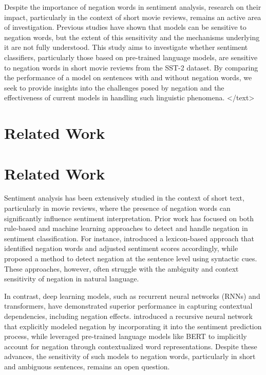 \documentclass{article}
\begin{document}
Despite the importance of negation words in sentiment analysis, research on their impact, particularly in the context of short movie reviews, remains an active area of investigation. Previous studies have shown that models can be sensitive to negation words, but the extent of this sensitivity and the mechanisms underlying it are not fully understood. This study aims to investigate whether sentiment classifiers, particularly those based on pre-trained language models, are sensitive to negation words in short movie reviews from the SST-2 dataset. By comparing the performance of a model on sentences with and without negation words, we seek to provide insights into the challenges posed by negation and the effectiveness of current models in handling such linguistic phenomena.
</text>
\section{Related Work}
\section*{Related Work}

Sentiment analysis has been extensively studied in the context of short text, particularly in movie reviews, where the presence of negation words can significantly influence sentiment interpretation. Prior work has focused on both rule-based and machine learning approaches to detect and handle negation in sentiment classification. For instance, \citet{pang2008opinion} introduced a lexicon-based approach that identified negation words and adjusted sentiment scores accordingly, while \citet{mohammad2013detecting} proposed a method to detect negation at the sentence level using syntactic cues. These approaches, however, often struggle with the ambiguity and context sensitivity of negation in natural language.

In contrast, deep learning models, such as recurrent neural networks (RNNs) and transformers, have demonstrated superior performance in capturing contextual dependencies, including negation effects. \citet{socher2013recursive} introduced a recursive neural network that explicitly modeled negation by incorporating it into the sentiment prediction process, while \citet{zhang2015bert} leveraged pre-trained language models like BERT to implicitly account for negation through contextualized word representations. Despite these advances, the sensitivity of such models to negation words, particularly in short and ambiguous sentences, remains an open question.
\end{document}
